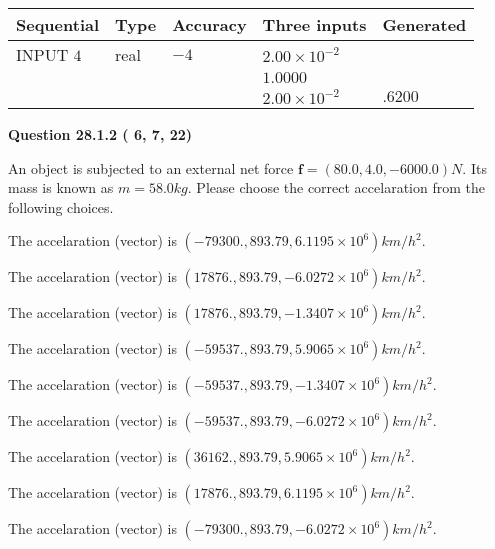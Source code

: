 \documentclass[12pt]{article}
\begin{document}
   
  
  
\noindent\begin{tabular}{|l|l|l|l|l|}
\hline
 Sequential & Type & Accuracy & Three inputs & Generated \\ 
\hline
 
 
  INPUT $           4$ & real & $          -4 $ & $
 2.00 \times 10^{-2}
  $ & \\
  & & &  $
 1.0000
  $ & \\
  & & &  $
 2.00 \times 10^{-2}
 $ & $ .6200 $ 
 \\  \hline  
 \end{tabular}
   
   
  
\vspace{0.2in}
  
{\textbf{\Large{Question
28.1.2 
 (          6,          7,         22)
}}}
  
  
 
An object is subjected to an external net force $\mathbf{f}=(
80.0 ,
4.0,
-6000.0  )N$. Its mass is known as
$m= %
58.0  kg$. Please choose the correct accelaration
from the following choices.
 
 
 
The accelaration (vector) is
$(
-79300.,
893.79 ,
6.1195 \times 10^{6}
)km/h^2.
$
 
 
The accelaration (vector) is
$(
17876.,
893.79 ,
-6.0272 \times 10^{6}
)km/h^2.
$
 
 
The accelaration (vector) is
$(
17876.,
893.79 ,
-1.3407 \times 10^{6}
)km/h^2.
$
 
 
The accelaration (vector) is
$(
-59537.,
893.79 ,
5.9065 \times 10^{6}
)km/h^2.
$
 
 
The accelaration (vector) is
$(
-59537.,
893.79 ,
-1.3407 \times 10^{6}
)km/h^2.
$
 
 
The accelaration (vector) is
$(
-59537.,
893.79 ,
-6.0272 \times 10^{6}
)km/h^2.
$
 
 
The accelaration (vector) is
$(
36162.,
893.79 ,
5.9065 \times 10^{6}
)km/h^2.
$
 
 
The accelaration (vector) is
$(
17876.,
893.79 ,
6.1195 \times 10^{6}
)km/h^2.
$
 
 
The accelaration (vector) is
$(
-79300.,
893.79 ,
-6.0272 \times 10^{6}
)km/h^2.
$
 
\end{document}
